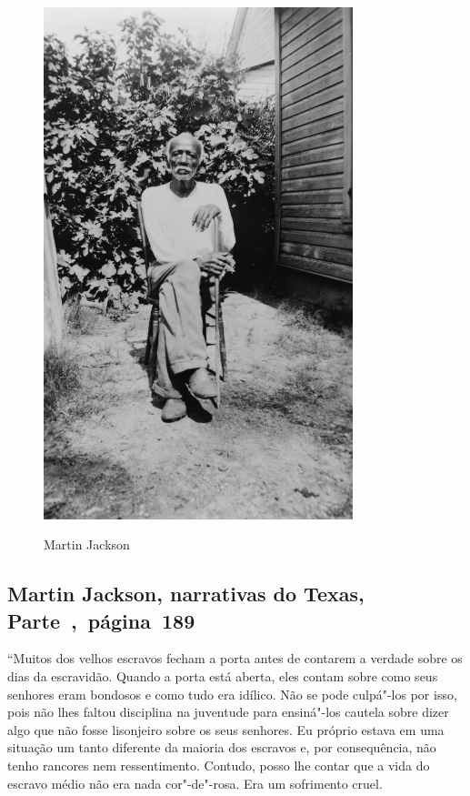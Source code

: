 \begin{figure}[]
\centering
 \includegraphics[width=90mm]{./imgs/martinjackson_recorte.jpg} \label{img13}
\caption{Martin Jackson}
\end{figure}

\subsection{Martin Jackson, narrativas do Texas, Parte~,~página~189}
\label{ref161}

``Muitos dos velhos escravos fecham a porta antes de contarem a verdade
sobre os dias da escravidão. Quando a porta está aberta, eles contam
sobre como seus senhores eram bondosos e como tudo era idílico. Não se
pode culpá"-los por isso, pois não lhes faltou disciplina na juventude
para ensiná"-los cautela sobre dizer algo que não fosse lisonjeiro sobre
os seus senhores. Eu próprio estava em uma situação um tanto diferente
da maioria dos escravos e, por consequência, não tenho rancores nem
ressentimento. Contudo, posso lhe contar que a vida do escravo médio não
era nada cor"-de"-rosa. Era um sofrimento cruel.

